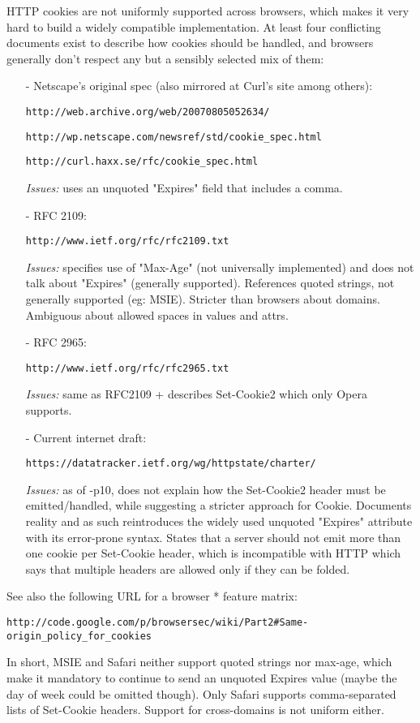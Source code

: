 HTTP cookies are not uniformly supported across browsers, which makes it very
hard to build a widely compatible implementation. At least four conflicting
documents exist to describe how cookies should be handled, and browsers
generally don't respect any but a sensibly selected mix of them:

\begin{itemize}
\item[-] Netscape's original spec (also mirrored at Curl's site among others):

    \verb|http://web.archive.org/web/20070805052634/|
    
    \verb|http://wp.netscape.com/newsref/std/cookie_spec.html|
    
    \verb|http://curl.haxx.se/rfc/cookie_spec.html|

    \emph{Issues:} uses an unquoted "Expires" field that includes a comma.

\item[-] RFC 2109:

    \verb|http://www.ietf.org/rfc/rfc2109.txt|

    \emph{Issues:} specifies use of "Max-Age" (not universally implemented) and does
            not talk about "Expires" (generally supported). References quoted
            strings, not generally supported (eg: MSIE). Stricter than browsers
            about domains. Ambiguous about allowed spaces in values and attrs.

\item[-] RFC 2965:
    
    \verb|http://www.ietf.org/rfc/rfc2965.txt|

    \emph{Issues:} same as RFC2109 + describes Set-Cookie2 which only Opera supports.

\item[-] Current internet draft:
    
    \verb|https://datatracker.ietf.org/wg/httpstate/charter/|

    \emph{Issues:} as of -p10, does not explain how the Set-Cookie2 header must be
            emitted/handled, while suggesting a stricter approach for Cookie.
            Documents reality and as such reintroduces the widely used unquoted
            "Expires" attribute with its error-prone syntax. States that a
            server should not emit more than one cookie per Set-Cookie header,
            which is incompatible with HTTP which says that multiple headers
            are allowed only if they can be folded.
\end{itemize}

See also the following URL for a browser * feature matrix:

   \verb|http://code.google.com/p/browsersec/wiki/Part2#Same-origin_policy_for_cookies|

In short, MSIE and Safari neither support quoted strings nor max-age, which
make it mandatory to continue to send an unquoted Expires value (maybe the
day of week could be omitted though). Only Safari supports comma-separated
lists of Set-Cookie headers. Support for cross-domains is not uniform either.
